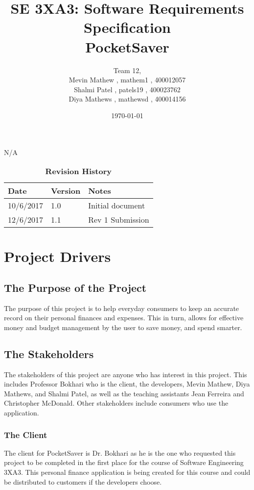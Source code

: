 \documentclass[12pt, titlepage]{article}
\title{SE 3XA3: Software Requirements Specification\\PocketSaver}
\author{Team 12, 
		\\ Mevin Mathew , mathem1 , 400012057
		\\ Shalmi Patel , patels19 , 400023762
		\\ Diya Mathews , mathewsd , 400014156
}
\date{\today}
\begin{document}
\maketitle

\tableofcontents
\listoftables
\listoffigures
N/A


\begin{table}[bp]
\caption{\bf Revision History}
\begin{tabularx}{\textwidth}{p{3cm}p{2cm}X}
\toprule {\bf Date} & {\bf Version} & {\bf Notes}\\
\midrule
10/6/2017 & 1.0 & Initial document\\
\midrule
12/6/2017 & 1.1 & Rev 1 Submission\\
\bottomrule
\end{tabularx}
\end{table}

\newpage



\section{Project Drivers}

\subsection{The Purpose of the Project}
The purpose of this project is to help everyday consumers to keep an accurate record on their personal finances and expenses. This in turn, allows for effective money and budget management by the user to save money, and spend smarter. 
\subsection{The Stakeholders}
The stakeholders of this project are anyone who has interest in this project. This includes Professor Bokhari who is the client, the developers, Mevin Mathew, Diya Mathews, and Shalmi Patel, as well as the teaching assistants Jean Ferreira and Christopher McDonald. Other stakeholders include consumers who use the application.
\subsubsection{The Client}
The client for PocketSaver is Dr. Bokhari  as he is the one who requested this project to be completed in the first place for the course of Software Engineering 3XA3. This personal finance application is being created for this course and could be distributed to customers if the developers choose.
\end{document}
